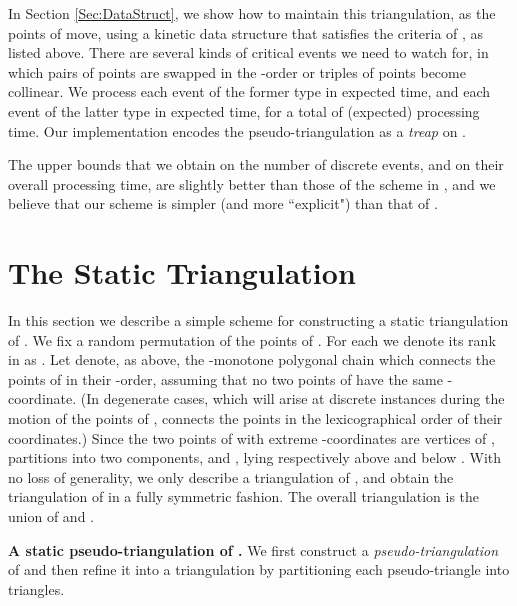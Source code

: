 \documentclass[11pt]{article}
\begin{document}
In Section \ref{Sec:DataStruct}, we show how to maintain this triangulation, as the points 
of  move, using a kinetic data structure that satisfies the criteria of \cite{BG99}, as listed above. 
There are several kinds of critical events we need to
watch for, in which pairs of points are swapped in the -order or
triples of points become collinear.
We process each event of the former type in  expected time, and each event of the latter type in  expected time, for a total of  (expected) processing time.
Our implementation encodes the pseudo-triangulation as a \textit{treap} on  \cite{SA96}. 



The upper bounds that we obtain on the number of discrete events, and on their overall processing time, are slightly better than those of the scheme in \cite{AWY}, and we believe that our scheme is simpler (and more ``explicit") than that of \cite{AWY}.
\section{The Static Triangulation}\label{Sect:Static}
In this section we describe a simple scheme for constructing a static triangulation  of .
We fix a random permutation  of the points of .  For each
 we denote its rank in  as .  Let 
denote, as above, the -monotone polygonal chain which connects the points of
 in their -order, assuming that no two points of  have the
same -coordinate. (In degenerate cases, which will arise at
discrete instances during the motion of the points of , 
connects the points in the lexicographical order of their
coordinates.)  Since the two points of  with extreme
-coordinates are vertices of ,  partitions 
into two components,  and , lying respectively
above and below . With no loss of generality, we only describe
a triangulation  of , and obtain the triangulation
 of  in a fully symmetric fashion.  The overall
triangulation  is the union of  and .


\medskip
\noindent
{\bf A static pseudo-triangulation of .}
We first construct a \textit{pseudo-triangulation} of  and
then refine it into a triangulation by partitioning each
pseudo-triangle into triangles.
\end{document}
